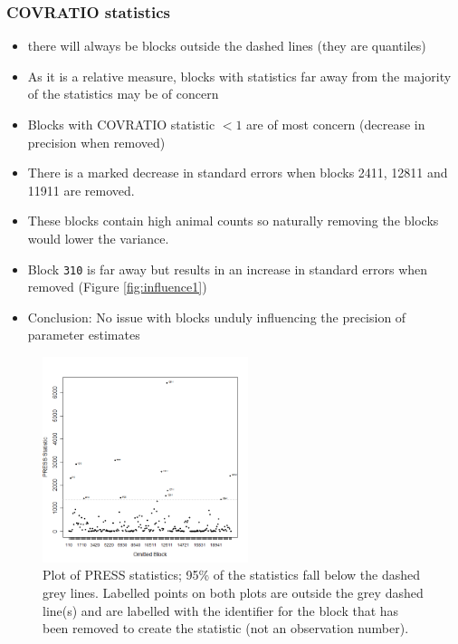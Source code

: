 \begin{frame}
\frametitle{COVRATIO statistics}
\begin{itemize}
  \item there will always be blocks outside the dashed lines (they are quantiles)
  \item As it is a relative measure, blocks with statistics far away from the majority of the statistics may be of concern
  \item Blocks with COVRATIO statistic $< 1$ are of most concern (decrease in precision when removed) 
  \item There is a marked decrease in standard errors when blocks 2411, 12811 and 11911 are removed.
  \item These blocks contain high animal counts so naturally removing the blocks would lower the variance.
  \item Block {\tt 310} is far away but results in an increase in standard errors when removed (Figure \ref{fig:influence1})
  \bigskip
  \item Conclusion: No issue with blocks unduly influencing the precision of parameter estimates
\end{itemize}
\end{frame}

\begin{frame}[fragile]
\begin{figure}[h]
  \centering
    \includegraphics[width=6cm]{danish/InfluenceMeasures_press.png}
  \caption{Plot of PRESS statistics; 95\% of the statistics fall below the dashed grey lines.  Labelled points on both plots are outside the grey dashed line(s) and are labelled with the identifier for the block that has been removed to create the statistic (not an observation number).}
  \label{fig:influence2}
\end{figure}
\end{frame}


